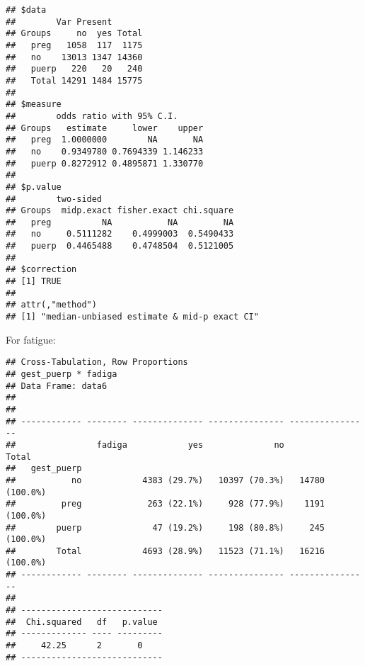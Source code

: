 \documentclass[
]{article}
\newenvironment{Shaded}{\begin{snugshade}}{\end{snugshade}}
\newcommand{\DataTypeTok}[1]{\textcolor[rgb]{0.13,0.29,0.53}{#1}}
\newcommand{\KeywordTok}[1]{\textcolor[rgb]{0.13,0.29,0.53}{\textbf{#1}}}
\newcommand{\NormalTok}[1]{#1}
\newcommand{\OperatorTok}[1]{\textcolor[rgb]{0.81,0.36,0.00}{\textbf{#1}}}
\newcommand{\OtherTok}[1]{\textcolor[rgb]{0.56,0.35,0.01}{#1}}
\newcommand{\StringTok}[1]{\textcolor[rgb]{0.31,0.60,0.02}{#1}}
\begin{document}
\begin{verbatim}
## $data
##        Var Present
## Groups     no  yes Total
##   preg   1058  117  1175
##   no    13013 1347 14360
##   puerp   220   20   240
##   Total 14291 1484 15775
## 
## $measure
##        odds ratio with 95% C.I.
## Groups   estimate     lower    upper
##   preg  1.0000000        NA       NA
##   no    0.9349780 0.7694339 1.146233
##   puerp 0.8272912 0.4895871 1.330770
## 
## $p.value
##        two-sided
## Groups  midp.exact fisher.exact chi.square
##   preg          NA           NA         NA
##   no     0.5111282    0.4999003  0.5490433
##   puerp  0.4465488    0.4748504  0.5121005
## 
## $correction
## [1] TRUE
## 
## attr(,"method")
## [1] "median-unbiased estimate & mid-p exact CI"
\end{verbatim}

For fatigue:

\begin{Shaded}
\end{Shaded}

\begin{verbatim}
## Cross-Tabulation, Row Proportions  
## gest_puerp * fadiga  
## Data Frame: data6  
## 
## 
## ------------ -------- -------------- --------------- ----------------
##                fadiga            yes              no            Total
##   gest_puerp                                                         
##           no            4383 (29.7%)   10397 (70.3%)   14780 (100.0%)
##         preg             263 (22.1%)     928 (77.9%)    1191 (100.0%)
##        puerp              47 (19.2%)     198 (80.8%)     245 (100.0%)
##        Total            4693 (28.9%)   11523 (71.1%)   16216 (100.0%)
## ------------ -------- -------------- --------------- ----------------
## 
## ----------------------------
##  Chi.squared   df   p.value 
## ------------- ---- ---------
##     42.25      2       0    
## ----------------------------
\end{verbatim}

\begin{Shaded}
\end{Shaded}
\end{document}
